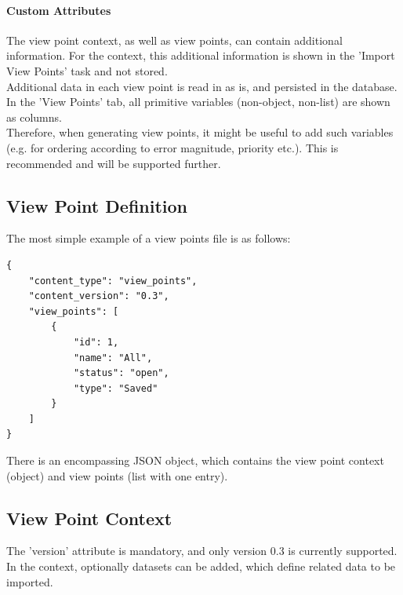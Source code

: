 \paragraph{Custom Attributes}
\label{sec:view_points_custom_attributes} 

The view point context, as well as view points, can contain additional information. For the context, this additional information is shown in the 'Import View Points' task and not stored. \\

Additional data in each view point is read in as is, and persisted in the database. In the 'View Points' tab, all primitive variables (non-object, non-list) are shown as columns. \\

Therefore, when generating view points, it might be useful to add such variables (e.g. for ordering according to error magnitude, priority etc.). This is recommended and will be supported further. \\
 
\subsection{View Point Definition}
 
The most simple example of a view points file is as follows:

\begin{lstlisting}[basicstyle=\small\ttfamily]
{
    "content_type": "view_points",
    "content_version": "0.3",
    "view_points": [
        {
            "id": 1,
            "name": "All",
            "status": "open",
            "type": "Saved"
        }
    ]
}
\end{lstlisting}

There is an encompassing JSON object, which contains the view point context (object) and view points (list with one entry). \\

\subsection{View Point Context}

The 'version' attribute is mandatory, and only version 0.3 is currently supported. \\

In the context, optionally datasets can be added, which define related data to be imported.

